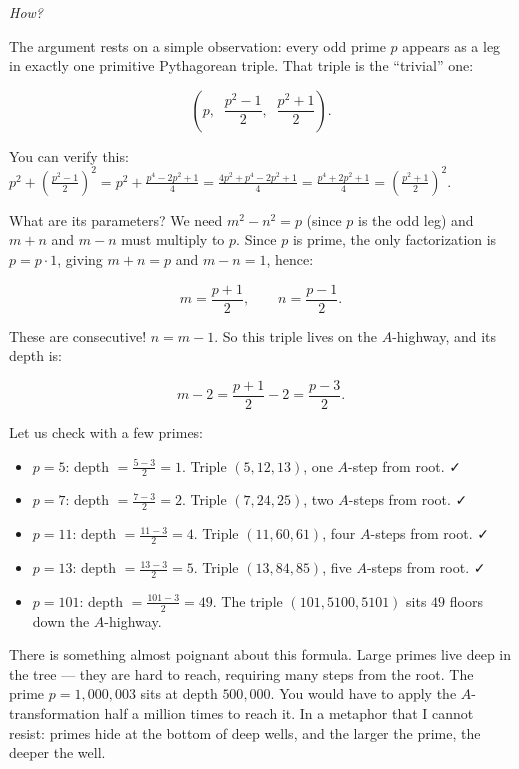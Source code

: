 \emph{How?}

The argument rests on a simple observation: every odd prime \(p\) appears as a leg in exactly one primitive Pythagorean triple. That triple is the ``trivial'' one:

\[\left(p,\;\; \frac{p^2 - 1}{2},\;\; \frac{p^2 + 1}{2}\right).\]

You can verify this: \(p^2 + \left(\frac{p^2-1}{2}\right)^2 = p^2 + \frac{p^4 - 2p^2 + 1}{4} = \frac{4p^2 + p^4 - 2p^2 + 1}{4} = \frac{p^4 + 2p^2 + 1}{4} = \left(\frac{p^2+1}{2}\right)^2\).

What are its parameters? We need \(m^2 - n^2 = p\) (since \(p\) is the odd leg) and \(m + n\) and \(m - n\) must multiply to \(p\). Since \(p\) is prime, the only factorization is \(p = p \cdot 1\), giving \(m + n = p\) and \(m - n = 1\), hence:

\[m = \frac{p + 1}{2}, \qquad n = \frac{p - 1}{2}.\]

These are consecutive! \(n = m - 1\). So this triple lives on the \(A\)-highway, and its depth is:

\[m - 2 = \frac{p + 1}{2} - 2 = \frac{p - 3}{2}.\]

Let us check with a few primes:

\begin{itemize}

\item
  \(p = 5\): depth \(= \frac{5-3}{2} = 1\). Triple \((5, 12, 13)\), one \(A\)-step from root. ✓
\item
  \(p = 7\): depth \(= \frac{7-3}{2} = 2\). Triple \((7, 24, 25)\), two \(A\)-steps from root. ✓
\item
  \(p = 11\): depth \(= \frac{11-3}{2} = 4\). Triple \((11, 60, 61)\), four \(A\)-steps from root. ✓
\item
  \(p = 13\): depth \(= \frac{13-3}{2} = 5\). Triple \((13, 84, 85)\), five \(A\)-steps from root. ✓
\item
  \(p = 101\): depth \(= \frac{101-3}{2} = 49\). The triple \((101, 5100, 5101)\) sits \(49\) floors down the \(A\)-highway.
\end{itemize}

There is something almost poignant about this formula. Large primes live deep in the tree --- they are hard to reach, requiring many steps from the root. The prime \(p = 1{,}000{,}003\) sits at depth \(500{,}000\). You would have to apply the \(A\)-transformation half a million times to reach it. In a metaphor that I cannot resist: primes hide at the bottom of deep wells, and the larger the prime, the deeper the well.


